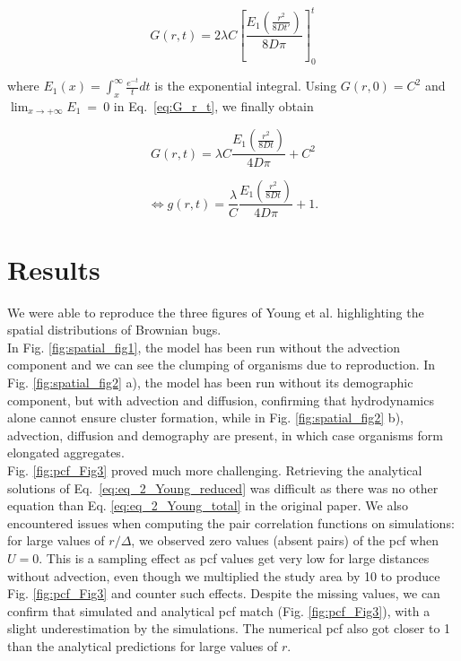 \begin{equation}
G(r,t)=2\lambda C\left[\frac{E_1 \left(\frac{r^{2}}{8Dt'}\right)}{8D\pi}\right]_{0}^{t}\label{eq:G_r_t}
\end{equation}

where $E_1(x)=\int_x^\infty \frac{e^{-t}}{t}dt$ is the exponential integral. Using $G(r,0)=C^{2}$ and
$\lim_{x\rightarrow+\infty}E_1~=~0$ in Eq.~\ref{eq:G_r_t}, we finally obtain

\begin{equation}
G(r,t)=\lambda C\frac{E_1\left(\frac{r^{2}}{8Dt}\right)}{4D\pi}+C^{2}
\end{equation}

\begin{equation}
\Leftrightarrow g(r,t)=\frac{\lambda}{C}\frac{E_1\left(\frac{r^{2}}{8Dt}\right)}{4D\pi}+1.
\end{equation}

\section*{Results}

We were able to reproduce the three figures of Young et al. \cite{young_reproductive_2001} highlighting the spatial distributions of Brownian bugs.\\

In Fig. \ref{fig:spatial_fig1}, the model has been run without the advection component and we can see the clumping of organisms due to reproduction. In Fig. \ref{fig:spatial_fig2} a), the model has been run without its demographic component, but with advection and diffusion, confirming that hydrodynamics alone cannot ensure cluster formation, while in Fig.  \ref{fig:spatial_fig2} b), advection, diffusion and demography are present, in which case organisms form elongated aggregates.\\
  
Fig. \ref{fig:pcf_Fig3} proved much more challenging. Retrieving the analytical solutions of Eq.~\ref{eq:eq_2_Young_reduced} was difficult as there was no other equation than Eq. \ref{eq:eq_2_Young_total} in the original paper. We also encountered issues when computing the pair correlation functions on simulations: for large values of $r/\Delta$, we observed zero values (absent pairs) of the pcf when $U=0$. This is a sampling effect as pcf values get very low for large distances without advection, even though we multiplied the study area by 10 to produce Fig.  \ref{fig:pcf_Fig3} and counter such effects. Despite the missing values, we can confirm that simulated and analytical pcf match (Fig. \ref{fig:pcf_Fig3}), with a slight underestimation by the simulations. The numerical pcf also got closer to 1 than the analytical predictions for large values of $r$.


